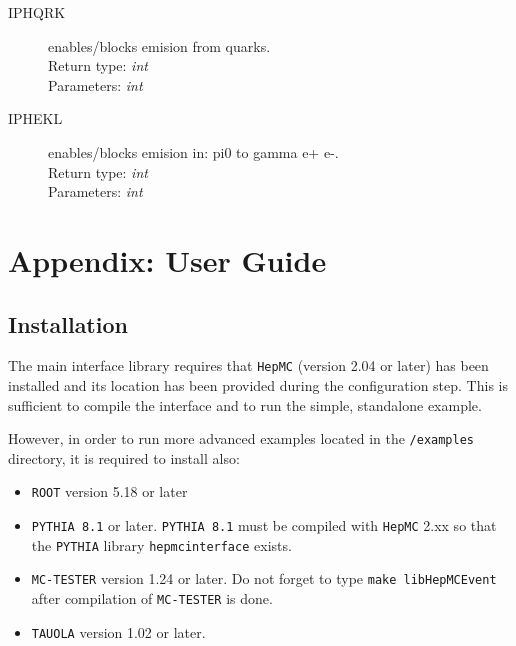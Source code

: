 \documentclass[]{Photos_interface_design}
\begin{document}
\begin{description}
\item[IPHQRK] enables/blocks emision from quarks. \\
  Return type: \textit{int} \\
  Parameters: \textit{int}
\end{description}

\begin{description}
\item[IPHEKL] enables/blocks emision in: pi0 to gamma e+ e-. \\
  Return type: \textit{int} \\
  Parameters: \textit{int}
\end{description}

\section{Appendix: User Guide}
\label{sec:User Guide}

\subsection{Installation}
\label{sec:Installation}
 
The main interface library requires that {\tt HepMC} \cite{Dobbs:2001ck} (version 2.04 or later)  has been installed
and its location has been provided during the configuration step. This is sufficient to compile the interface and to run the simple, standalone example.

However, in order to run more advanced examples located in the {\tt /examples} directory, it is required to install also:

\begin{itemize}
  \item {\tt ROOT} \cite{root-install-www} version 5.18 or later
  \item {\tt PYTHIA 8.1} \cite{Sjostrand:2007gs} or later. {\tt PYTHIA 8.1} must be compiled with {\tt HepMC} 2.xx
        so that the {\tt PYTHIA} library {\tt hepmcinterface} exists.
  \item {\tt MC-TESTER} \cite{Golonka:2002rz,Davidson:2008ma} version 1.24 or later.
        Do not forget to type {\tt make libHepMCEvent} after compilation of {\tt MC-TESTER} is done.
  \item {\tt TAUOLA} \cite{Davidson:2010rw} version 1.02 or later.
\end{itemize}
\end{document}

